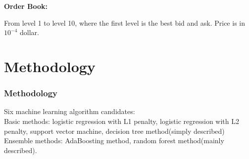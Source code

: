 \documentclass[xcolor={x11names,svgnames,dvipsnames}]{beamer}
\begin{document}
\begin{frame}
	\textbf{Order Book:}
\begin{table}
   	\caption{Limit book example of stock AMZN,   a sample on 2012-06-21}
   	\label{tab:limit}
   	\begin{center} 
   	\end{center}
\end{table} 
From level \alert{1 to level 10}, where the first level is the best bid and ask. Price is in \alert{$10^{-4}$} dollar.	
\end{frame}



\section{Methodology}
\begin{frame}
\frametitle{Methodology}
Six machine learning algorithm candidates:\\
 \vspace{1cm}
Basic methods: logistic regression with L1 penalty, logistic regression with L2 penalty, support vector machine, decision tree method(simply described)\\
\vspace{1cm}
Ensemble methods: AdaBoosting method, random forest method(mainly described).


\end{frame}
\end{document}
